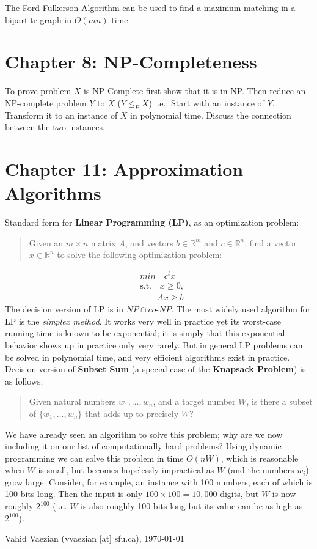 \documentclass{report}
\begin{document}
The Ford-Fulkerson Algorithm can be used to find a maximum matching in a bipartite graph in $O(mn)$ time.
\section*{Chapter 8: NP-Completeness}
To prove problem $X$ is NP-Complete first show that it is in NP. Then reduce an NP-complete problem $Y$ to $X$ ($Y\leq_P X$) i.e.: Start with an instance of $Y$. Transform it to an instance of $X$ in polynomial time. Discuss the connection between the two instances.
\section*{Chapter 11: Approximation Algorithms}
Standard form for \textbf{Linear Programming (LP)}, as an optimization problem:
\begin{quote}
	Given an $m \times n$ matrix $A$, and vectors $b\in \mathbb{R}^m$ and $c \in \mathbb{R}^n$, find a vector
	$x \in \mathbb{R}^n$ to solve the following optimization problem:
\end{quote}
\vspace{-1cm}
\begin{align*}
&min \quad c^tx\\
&\text{s.t.} \quad x\geq 0,\\
& \qquad Ax\geq b
\end{align*}
The decision version of LP is in $NP\cap co\text{-}NP$.
The most widely used algorithm for LP is the \emph{simplex method}. It
works very well in practice yet its worst-case running time is known
to be exponential; it is simply that this exponential behavior shows up in
practice only very rarely. But in general LP problems can be solved in polynomial time, and very efficient algorithms exist in practice. \\

Decision version of \textbf{Subset Sum} (a special case of the \textbf{Knapsack Problem}) is as follows:
\begin{quote}
	Given natural numbers $w_1, \ldots , w_n$, and a target number $W$, is there a
	subset of $\{w_1, \ldots , w_n\}$ that adds up to precisely $W$?
\end{quote}

We have already seen an algorithm to solve this problem; why are we now
including it on our list of computationally hard problems? Using dynamic programming we can solve this problem in time $O(nW)$, which is reasonable when $W$ is small, but becomes hopelessly impractical as $W$ (and the numbers $w_i$) grow large. Consider, for example, an instance with 100 numbers, each of
which is 100 bits long. Then the input is only $100 \times 100 = 10,000$ digits, but $W$ is now roughly $2^{100}$ (i.e. $W$ is also roughly 100 bits long but its value can be as high as $2^{100}$).
\hfill
\begin{flushright}
\small{Vahid Vaezian (vvaezian [at] sfu.ca), \today}
\end{flushright}
\end{document}

